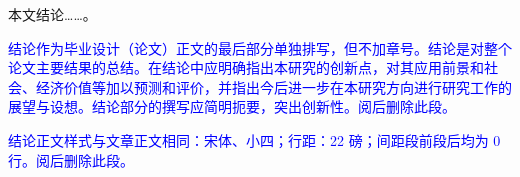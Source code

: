 %
%
%
%
%
%

\begin{conclusion}

  本文结论……\cite{张伯伟2002全唐五代诗格会考}。

  \textcolor{blue}{结论作为毕业设计（论文）正文的最后部分单独排写，但不加章号。结论是对整个论文主要结果的总结。在结论中应明确指出本研究的创新点，对其应用前景和社会、经济价值等加以预测和评价，并指出今后进一步在本研究方向进行研究工作的展望与设想。结论部分的撰写应简明扼要，突出创新性。阅后删除此段。}

  \textcolor{blue}{结论正文样式与文章正文相同：宋体、小四；行距：22 磅；间距段前段后均为 0 行。阅后删除此段。}
\end{conclusion}

